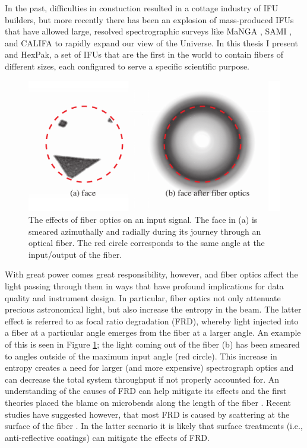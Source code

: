 In the past, difficulties in constuction resulted in a cottage
industry of IFU builders, but more recently there has been an
explosion of mass-produced IFUs that have allowed large, resolved
spectrographic surveys like MaNGA \citep{Bundy15}, SAMI
\citep{Croom12}, and CALIFA \citep{Sanchez12} to rapidly expand our
view of the Universe. In this thesis I present \GP and HexPak, a set
of IFUs that are the first in the world to contain fibers of different
sizes, each configured to serve a specific scientific purpose.

\begin{figure}
  \centering
  \includegraphics[width=\textwidth]{Introduction/figs/FRDude.pdf}
  \caption[Face on FRD]{\fixspacing\label{intro:fig:FRDude}The effects
    of fiber optics on an input signal. The face in (a) is smeared
    azimuthally and radially during its journey through an optical
    fiber. The red circle corresponds to the same angle at the
    input/output of the fiber.}
\end{figure}

With great power comes great responsibility, however, and fiber optics
affect the light passing through them in ways that have profound
implications for data quality and instrument design. In particular,
fiber optics not only attenuate precious astronomical light, but also
increase the entropy in the beam. The latter effect is referred to as
focal ratio degradation (FRD), whereby light injected into a fiber at
a particular angle emerges from the fiber at a larger angle. An
example of this is seen in Figure \ref{intro:fig:FRDude}; the light
coming out of the fiber (b) has been smeared to angles outside of the
maximum input angle (red circle). This increase in entropy creates a
need for larger (and more expensive) spectrograph optics and can
decrease the total system throughput if not properly accounted for. An
understanding of the causes of FRD can help mitigate its effects and
the first theories placed the blame on microbends along the length of
the fiber \citep{Gloge72,Carrasco94}. Recent studies have suggested
however, that most FRD is caused by scattering at the surface of the
fiber \citep{Avila98,Haynes11,Eigenbrot12}. In the latter scenario it
is likely that surface treatments (i.e., anti-reflective coatings) can
mitigate the effects of FRD.

\clearpage
{} %



